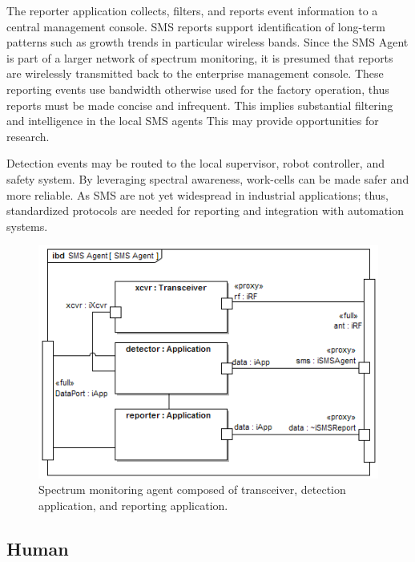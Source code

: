 \documentclass[journal, twoside]{IEEEtran}
\begin{document}
	The reporter application collects, filters, and reports event information to a central management console.  SMS reports support identification of long-term patterns such as growth trends in particular wireless bands.  Since the SMS Agent is part of a larger network of spectrum monitoring, it is presumed that reports are wirelessly transmitted back to the enterprise management console.  These reporting events use bandwidth otherwise used for the factory operation, thus reports must be made concise and infrequent.  This implies substantial filtering and intelligence in the local SMS agents This may provide opportunities for research.
	
	Detection events may be routed to the local supervisor, robot controller, and safety system.  By leveraging spectral awareness, work-cells can be made safer and more reliable.  As SMS are not yet widespread in industrial applications; thus, standardized protocols are needed for reporting and integration with automation systems.
	
	\begin{figure}[tbp]
		\includegraphics[width=\columnwidth]{diagrams/ibd__SMS_Agent__SMS_Agent}
		\caption{Spectrum monitoring agent composed of transceiver, detection application, and reporting application.}
		\label{fig:sms:bdd}
	\end{figure}
	
	\subsection{Human}\label{sec:human}
        
\end{document}
